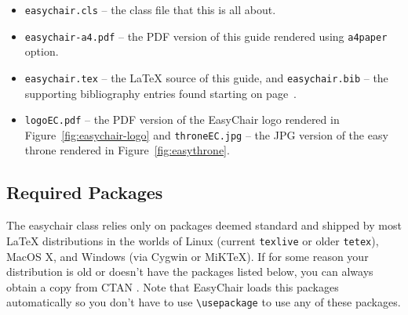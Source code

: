 \documentclass[withtimes]{easychair}
\newcommand{\easychair}{\textsf{easychair}}
\newcommand{\miktex}{MiK{\TeX}}
\begin{document}
\begin{itemize}
\item
\texttt{easychair.cls} -- the class file that this is all about.

\item
\texttt{easychair-a4.pdf} -- the PDF version of this guide rendered using 
\texttt{a4paper} option.

\item
\texttt{easychair.tex} -- the {\LaTeX} source of this guide, 
and
\texttt{easychair.bib} -- the supporting bibliography entries found starting 
on page~\pageref{sect:bib}.

\item
\texttt{logoEC.pdf} -- the PDF version of the EasyChair logo rendered in
Figure~\ref{fig:easychair-logo} and
\texttt{throneEC.jpg} -- the JPG version of the easy throne rendered in 
Figure~\ref{fig:easythrone}.

\end{itemize}

\subsection{Required Packages}

The {\easychair} class relies only on packages deemed standard and shipped by
most {\LaTeX} distributions in the worlds of Linux (current \texttt{texlive} \cite{texlive}
or older \texttt{tetex}), MacOS X,
and Windows (via Cygwin or {\miktex}).
If for some reason your distribution is old or doesn't have the packages
listed below, you can always obtain a copy from CTAN \cite{ctan}. Note
that EasyChair loads this packages automatically so you don't have to
use \verb|\usepackage| to use any of these packages.
\end{document}
